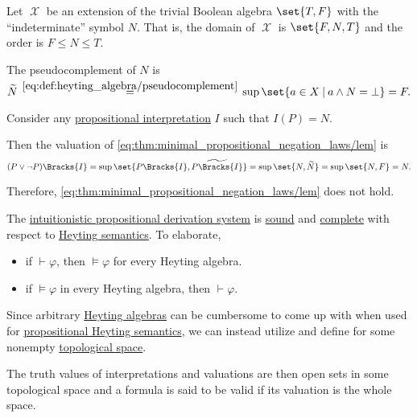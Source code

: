 \begin{example}\label{ex:heyting_semantics_lem_counterexample}
  Let \( \mscrX \) be an extension of the trivial Boolean algebra \( \set{ T, F } \) with the \enquote{indeterminate} symbol \( N \). That is, the domain of \( \mscrX \) is \( \set{ F, N, T } \) and the order is \( F \leq N \leq T \).

  The pseudocomplement of \( N \) is
  \begin{equation*}
    \widetilde{N}
    \reloset {\eqref{eq:def:heyting_algebra/pseudocomplement}} =
    \sup\set{ a \in X \given a \wedge N = \bot }
    =
    F.
  \end{equation*}

  Consider any \hyperref[def:propositional_valuation]{propositional interpretation} \( I \) such that \( I(P) = N \).

  Then the valuation of \eqref{eq:thm:minimal_propositional_negation_laws/lem} is
  \begin{equation*}
    (P \vee \neg P)\Bracks{I}
    =
    \sup\set{ P\Bracks{I}, \widetilde{P\Bracks{I}} }
    =
    \sup\set{ N, \widetilde{N} }
    =
    \sup\set{ N, F }
    =
    N.
  \end{equation*}

  Therefore, \eqref{eq:thm:minimal_propositional_negation_laws/lem} does not hold.
\end{example}

\begin{theorem}\label{thm:intuitionistic_propositional_logic_is_sound_and_complete}
  The \hyperref[def:intuitionistic_propositional_derivation_system]{intuitionistic propositional derivation system} is \hyperref[def:derivability_and_satisfiability/soundness]{sound} and \hyperref[def:derivability_and_satisfiability/completeness]{complete} with respect to \hyperref[def:propositional_heyting_algebra_semantics]{Heyting semantics}. To elaborate,
  \begin{itemize}
    \item if \( \vdash \varphi \), then \( \vDash \varphi \) for every Heyting algebra.
    \item if \( \vDash \varphi \) in every Heyting algebra, then \( \vdash \varphi \).
  \end{itemize}
\end{theorem}

\begin{definition}\label{def:propositional_topological_semantics}
  Since arbitrary \hyperref[def:heyting_algebra]{Heyting algebras} can be cumbersome to come up with when used for \hyperref[def:propositional_heyting_algebra_semantics]{propositional Heyting semantics}, we can instead utilize  and define  for some nonempty \hyperref[def:topological_space]{topological space}.

  The truth values of interpretations and valuations are then open sets in some topological space and a formula is said to be valid if its valuation is the whole space.
\end{definition}

